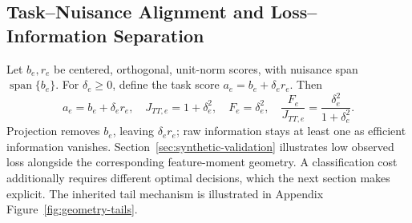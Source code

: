 \subsection{Task--Nuisance Alignment and Loss--Information Separation}
\label{sec:tangency-separation}

Let $b_e,r_e$ be centered, orthogonal, unit-norm scores, with nuisance span $\operatorname{span}\{b_e\}$. For $\delta_e\ge0$, define the task score $a_e=b_e+\delta_e r_e$. Then
\begin{equation}
a_e=b_e+\delta_e r_e,
\quad J_{TT,e}=1+\delta_e^2,
\quad F_e=\delta_e^2,
\quad \frac{F_e}{J_{TT,e}}=\frac{\delta_e^2}{1+\delta_e^2}.
\label{eq:tangency-identities}
\end{equation}
Projection removes $b_e$, leaving $\delta_e r_e$; raw information stays at least one as efficient information vanishes. Section~\ref{sec:synthetic-validation} illustrates low observed loss alongside the corresponding feature-moment geometry. A classification cost additionally requires different optimal decisions, which the next section makes explicit. The inherited tail mechanism is illustrated in Appendix Figure~\ref{fig:geometry-tails}.

